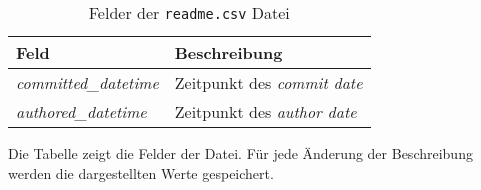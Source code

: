 \begin{table}
    \begin{tabularx}{\textwidth}{XL{10.2cm}}
        \toprule
        \textbf{Feld}              & \textbf{Beschreibung}            \\ \midrule
        \emph{committed\_datetime} & Zeitpunkt des \emph{commit date} \\
        \emph{authored\_datetime}  & Zeitpunkt des \emph{author date} \\
        \bottomrule
    \end{tabularx}
    \caption{Felder der \texttt{readme.csv} Datei}
    \label{tab:readme}
    \small
    Die Tabelle zeigt die Felder der  Datei. Für jede Änderung der Beschreibung werden die dargestellten Werte gespeichert.
\end{table}
